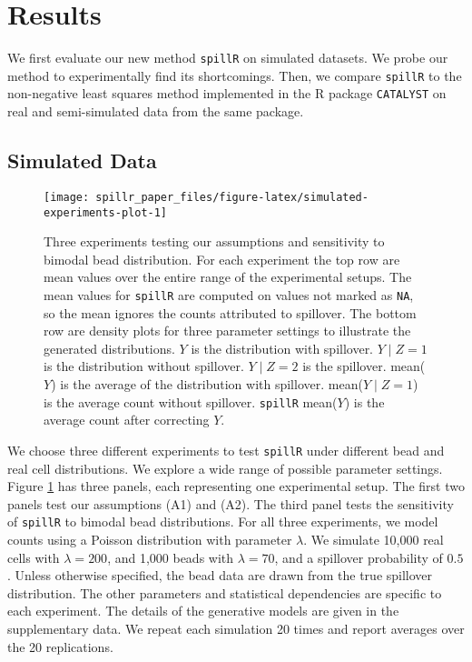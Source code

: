 \documentclass{bioinfo}
\begin{document}
\section{Results}

\label{results}

We first evaluate our new method \texttt{spillR} on simulated datasets.
We probe our method to experimentally find its shortcomings. Then, we
compare \texttt{spillR} to the non-negative least squares method
implemented in the R package \texttt{CATALYST} on real and
semi-simulated data from the same package.

\subsection{Simulated Data}

\label{simulated-data}

\begin{figure}

{\centering \texttt{[image: spillr\_paper\_files/figure-latex/simulated-experiments-plot-1]} 

}

\caption{Three experiments testing our assumptions and sensitivity to bimodal bead distribution. For each experiment the top row are mean values over the entire range of the experimental setups. The mean values for \texttt{spillR} are computed on values not marked as \texttt{NA}, so the mean ignores the counts attributed to spillover. The bottom row are density plots for three parameter settings to illustrate the generated distributions. $Y$ is the distribution with spillover. $Y \mid Z = 1$ is the distribution without spillover. $Y \mid Z = 2$ is the spillover. mean($Y$) is the average of the distribution with spillover. mean($Y \mid Z = 1$) is the average count without spillover. \texttt{spillR} mean($Y$) is the average count after correcting $Y$.}\label{fig:simulated-experiments-plot}
\end{figure}

We choose three different experiments to test \texttt{spillR} under
different bead and real cell distributions. We explore a wide range of
possible parameter settings. Figure \ref{fig:simulated-experiments-plot}
has three panels, each representing one experimental setup. The first
two panels test our assumptions (A1) and (A2). The third panel tests the
sensitivity of \texttt{spillR} to bimodal bead distributions. For all
three experiments, we model counts using a Poisson distribution with
parameter \(\lambda\). We simulate 10,000 real cells with
\(\lambda = 200\), and 1,000 beads with \(\lambda = 70\), and a
spillover probability of \(0.5\). Unless otherwise specified, the bead
data are drawn from the true spillover distribution. The other
parameters and statistical dependencies are specific to each experiment.
The details of the generative models are given in the supplementary
data. We repeat each simulation 20 times and report averages over the 20
replications.
\end{document}
